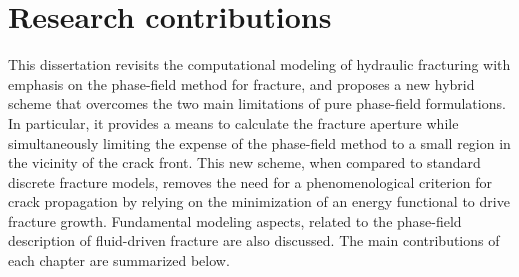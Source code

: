 \section{Research contributions}

This dissertation revisits the computational modeling of hydraulic fracturing with emphasis on the phase-field method for fracture, and proposes a new hybrid scheme that overcomes the two main limitations of pure phase-field formulations.
In particular, it provides a means to calculate the fracture aperture while simultaneously limiting the expense of the phase-field method to a small region in the vicinity of the crack front.  
This new scheme, when compared to standard discrete fracture models, removes the need for a phenomenological criterion for crack propagation by relying on the minimization of an energy functional to drive fracture growth.
Fundamental modeling aspects, related to the phase-field description of fluid-driven fracture are also discussed. The main contributions of each chapter are summarized below.


